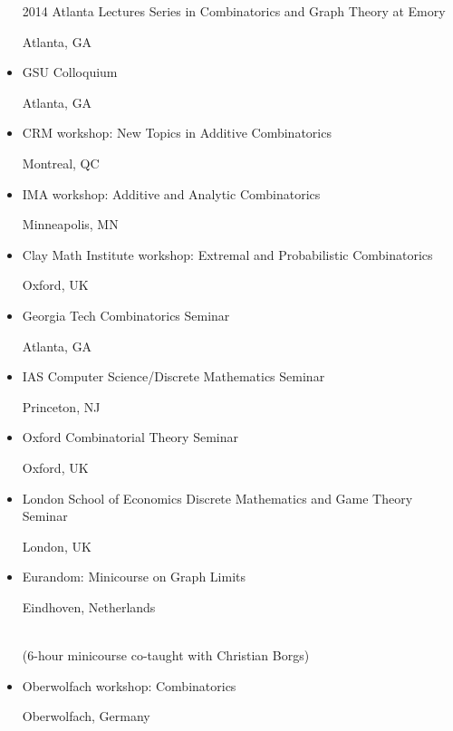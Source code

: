 \documentclass[11pt]{amsart}
\newcommand{\rightloc}[1]{\hfill {\raggedright #1}}
\begin{document}
\begin{itemize}[leftmargin=.4in,itemsep=5pt,topsep=0pt,label={}]
\item[2014] Atlanta Lectures Series in Combinatorics and Graph
  Theory at Emory \rightloc{Atlanta, GA}

\item GSU Colloquium
  \rightloc{Atlanta, GA}

\item CRM workshop: New Topics in Additive Combinatorics
  \rightloc{Montreal, QC}


\item IMA workshop: Additive and Analytic Combinatorics
  \rightloc{Minneapolis, MN}


\item Clay Math Institute workshop: Extremal and
  Probabilistic Combinatorics
  \rightloc{Oxford, UK}

\item Georgia Tech Combinatorics Seminar
  \rightloc{Atlanta, GA}

\item IAS Computer Science/Discrete Mathematics Seminar
  \rightloc{Princeton, NJ}

\item Oxford Combinatorial Theory Seminar \rightloc{Oxford, UK}

\item London School of Economics Discrete Mathematics and
  Game Theory Seminar \rightloc{London, UK}

\item Eurandom: Minicourse on Graph Limits
  \rightloc{Eindhoven, Netherlands} \\
  \mbox{}\qquad (6-hour minicourse co-taught with Christian Borgs)

\item Oberwolfach workshop: Combinatorics
  \rightloc{Oberwolfach, Germany}


\end{itemize}
\end{document}

